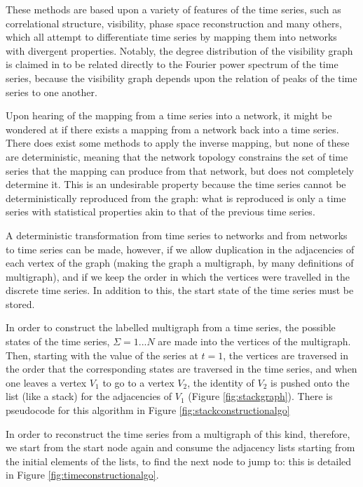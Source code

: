 \documentclass[12pt]{article}
\begin{document}
These methods are based upon a variety of features of the time series, such as correlational structure\cite{correlationgraph}, visibility\cite{lacasa}, phase space reconstruction\cite{phasespacegraph} and many others, which all attempt to differentiate time series by mapping them into networks with divergent properties. Notably, the degree distribution of the visibility graph is claimed in \cite{lacasa} to be related directly to the Fourier power spectrum of the time series, because the visibility graph depends upon the relation of peaks of the time series to one another.

Upon hearing of the mapping from a time series into a network, it might be wondered at if there exists a mapping from a network back into a time series. There does exist some methods to apply the inverse mapping, but none of these are deterministic, meaning that the network topology constrains the set of time series that the mapping can produce from that network, but does not completely determine it\cite{campanharo}. This is an undesirable property because the time series cannot be deterministically reproduced from the graph: what is reproduced is only a time series with statistical properties akin to that of the previous time series.

A deterministic transformation from time series to networks and from networks to time series can be made, however, if we allow duplication in the adjacencies of each vertex of the graph (making the graph a multigraph, by many definitions of multigraph\cite{multigraph}), and if we keep the order in which the vertices were travelled in the discrete time series. In addition to this, the start state of the time series must be stored.

In order to construct the labelled multigraph from a time series, the possible states of the time series, $\Sigma = {1 ... N}$ are made into the vertices of the multigraph. Then, starting with the value of the series at $t =1$, the vertices are traversed in the order that the corresponding states are traversed in the time series, and when one leaves a vertex $V_1$ to go to a vertex $V_2$, the identity of $V_2$ is pushed onto the list (like a stack) for the adjacencies of $V_1$ (Figure \ref{fig:stackgraph}). There is pseudocode for this algorithm in Figure \ref{fig:stackconstructionalgo}

In order to reconstruct the time series from a multigraph of this kind, therefore, we start from the start node again and consume the adjacency lists starting from the initial elements of the lists, to find the next node to jump to: this is detailed in Figure \ref{fig:timeconstructionalgo}.
\end{document}
